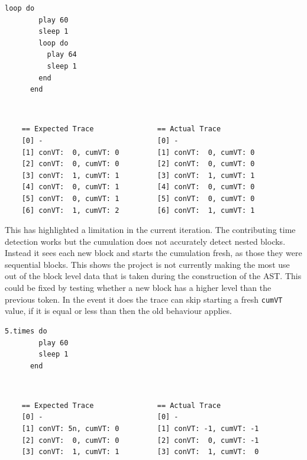 \documentclass[11pt, abstracton, twoside, titlepage=true]{scrartcl}
\begin{document}
\begin{minipage}{\textwidth}
	\begin{lstlisting}[style = sonicpi]
      loop do
        play 60
        sleep 1
        loop do
          play 64
          sleep 1
        end
      end
	\end{lstlisting}
\end{minipage}
\\
\begin{lstlisting}
    == Expected Trace               == Actual Trace
    [0] -                           [0] -
    [1] conVT:  0, cumVT: 0         [1] conVT:  0, cumVT: 0
    [2] conVT:  0, cumVT: 0         [2] conVT:  0, cumVT: 0
    [3] conVT:  1, cumVT: 1         [3] conVT:  1, cumVT: 1
    [4] conVT:  0, cumVT: 1         [4] conVT:  0, cumVT: 0
    [5] conVT:  0, cumVT: 1         [5] conVT:  0, cumVT: 0
    [6] conVT:  1, cumVT: 2         [6] conVT:  1, cumVT: 1
\end{lstlisting}

This has highlighted a limitation in the current iteration. The contributing time 
detection works but the cumulation does not accurately detect nested blocks. 
Instead it sees each new block and starts the cumulation fresh, as those they were
sequential blocks. This shows the project is not currently making the most use out 
of the block level data that is taken during the construction of the AST. This could 
be fixed by testing whether a new block has a higher level than the previous token.
In the event it does the trace can skip starting a fresh \texttt{cumVT} value, if it 
is equal or less than then the old behaviour applies. 

\begin{minipage}{\textwidth}
	\begin{lstlisting}[style = sonicpi]
      5.times do
        play 60
        sleep 1
      end
	\end{lstlisting}
\end{minipage}
\\
\begin{lstlisting}
    == Expected Trace               == Actual Trace
    [0] -                           [0] -
    [1] conVT: 5n, cumVT: 0         [1] conVT: -1, cumVT: -1
    [2] conVT:  0, cumVT: 0         [2] conVT:  0, cumVT: -1
    [3] conVT:  1, cumVT: 1         [3] conVT:  1, cumVT:  0
\end{lstlisting}
\end{document}
